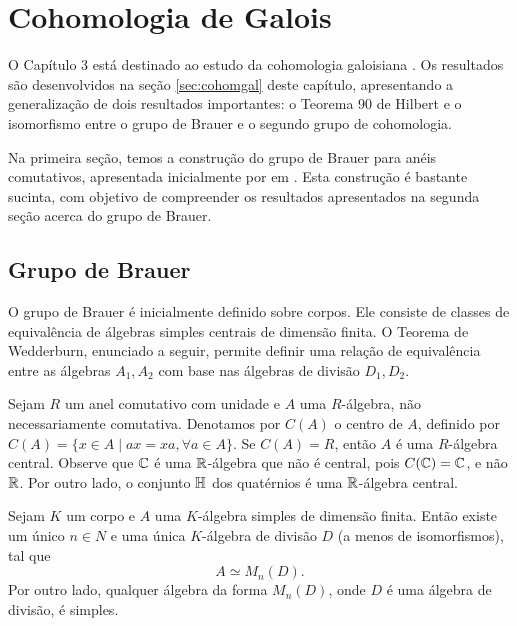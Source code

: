 \chapter{Cohomologia de Galois}
O Capítulo 3 está destinado ao estudo da cohomologia galoisiana \cite[]{chr}. Os resultados são desenvolvidos na seção \ref{sec:cohomgal} deste capítulo, apresentando a generalização de dois resultados importantes: o Teorema 90 de Hilbert e o isomorfismo entre o grupo de Brauer e o segundo grupo de cohomologia. \par 
Na primeira seção, temos a construção do grupo de Brauer para anéis comutativos, apresentada inicialmente por \citeauthor{brauer} em \cite{brauer}. Esta construção é bastante sucinta, com objetivo de compreender os resultados apresentados na segunda seção acerca do grupo de Brauer.

\section{Grupo de Brauer} \label{sec:brauer} %
O grupo de Brauer é inicialmente definido sobre corpos. Ele consiste de classes de equivalência de álgebras simples centrais de dimensão finita. O Teorema de Wedderburn, enunciado a seguir, permite definir uma relação de equivalência entre as álgebras $A_1, A_2$ com base nas álgebras de divisão $D_1,D_2$. \par
Sejam $R$ um anel comutativo com unidade e $A$ uma $R$-álgebra, não necessariamente comutativa. Denotamos por $C(A)$ o centro de $A$, definido por $C(A) = \{x \in A \mid ax = xa, \forall a \in A \}.$ Se $C(A)=R$, então $A$ é uma $R$-álgebra central. Observe que $\mathbb{C}$ é uma $\mathbb{R}$-álgebra que não é central, pois $C(\mathbb{C}) = \mathbb{C}$, e não $\mathbb{R}$. Por outro lado, o conjunto $\mathbb{H}$ dos quatérnios é uma $\mathbb{R}$-álgebra central. \par 
\begin{teo}[Wedderburn] \label{teo:wedderburn} \cite[Theorem 1]{rapinchuk}
Sejam $K$ um corpo e $A$ uma $K$-álgebra simples de dimensão finita. Então existe um único $n \in N$ e uma única $K$-álgebra de divisão $D$ (a menos de isomorfismos), tal que \[A \simeq M_n(D).\] Por outro lado, qualquer álgebra da forma $M_n(D)$, onde $D$ é uma álgebra de divisão, é simples.
\end{teo}

